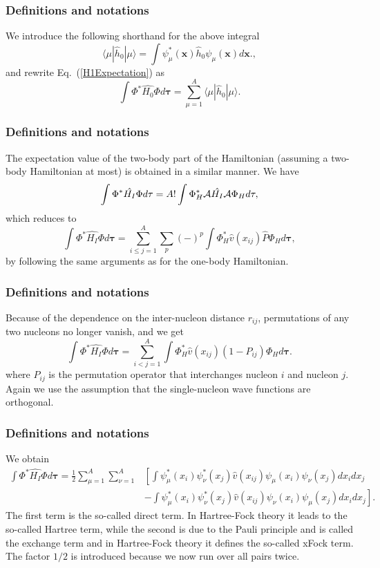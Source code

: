 \documentclass[compress]{beamer}
\begin{document}
\frame
{
  \frametitle{Definitions and notations}
\begin{small}
{\scriptsize
We introduce the following shorthand for the above integral
\[
\langle \mu | \hat{h}_0 | \mu \rangle = \int \psi_{\mu}^*(\mathbf{x})\hat{h}_0\psi_{\mu}(\mathbf{x})d\mathbf{x}.,
\]
and rewrite Eq.~(\ref{H1Expectation}) as
\begin{equation}
  \int \Phi^*\hat{H_0}\Phi  d\mathbf{\tau}
  = \sum_{\mu=1}^A \langle \mu | \hat{h}_0 | \mu \rangle.
  \label{H1Expectation1}
\end{equation}

}
\end{small}
}
\frame
{
  \frametitle{Definitions and notations}
\begin{small}
{\scriptsize
The expectation value of the two-body part of the Hamiltonian (assuming a two-body Hamiltonian at most) is obtained in a
similar manner. We have
\begin{equation*}
  \int \Phi^*\hat{H_I}\Phi d\mathbf{\tau} 
  = A! \int \Phi_H^*{\cal A}\hat{H_I}{\cal A}\Phi_H d\mathbf{\tau},
\end{equation*}
which reduces to
\begin{equation*}
 \int \Phi^*\hat{H_I}\Phi d\mathbf{\tau} 
  = \sum_{i\le j=1}^A \sum_{p} (-)^p\int 
  \Phi_H^*\hat{v}(x_{ij})\hat{P}\Phi_H d\mathbf{\tau},
\end{equation*}
by following the same arguments as for the one-body
Hamiltonian. 
}
\end{small}
}
\frame
{
  \frametitle{Definitions and notations}
\begin{small}
{\scriptsize
Because of the dependence on the inter-nucleon distance $r_{ij}$,  permutations of
any two nucleons no longer vanish, and we get
\begin{equation*}
  \int \Phi^*\hat{H_I}\Phi d\mathbf{\tau} 
  = \sum_{i < j=1}^A \int  
  \Phi_H^*\hat{v}(x_{ij})(1-P_{ij})\Phi_H d\mathbf{\tau}.
\end{equation*}
where $P_{ij}$ is the permutation operator that interchanges
nucleon $i$ and nucleon $j$. Again we use the assumption that the single-nucleon wave functions
are orthogonal. 
}
\end{small}
}
\frame
{
  \frametitle{Definitions and notations}
\begin{small}
{\scriptsize
We obtain
\begin{equation}
\begin{split}
  \int \Phi^*\hat{H_I}\Phi d\mathbf{\tau} 
  = \frac{1}{2}\sum_{\mu=1}^A\sum_{\nu=1}^A
    &\left[ \int \psi_{\mu}^*(x_i)\psi_{\nu}^*(x_j)\hat{v}(x_{ij})\psi_{\mu}(x_i)\psi_{\nu}(x_j)
    dx_idx_j \right.\\
  &\left.
  - \int \psi_{\mu}^*(x_i)\psi_{\nu}^*(x_j)
  \hat{v}(x_{ij})\psi_{\nu}(x_i)\psi_{\mu}(x_j)
  dx_idx_j
  \right]. \label{H2Expectation}
\end{split}
\end{equation}
The first term is the so-called direct term. In Hartree-Fock theory it leads to the so-called Hartree term, 
while the second is due to the Pauli principle and is called
the exchange term and in Hartree-Fock theory it defines the so-called xFock term.
The factor  $1/2$ is introduced because we now run over
all pairs twice. 
}
\end{small}
}
\end{document}
